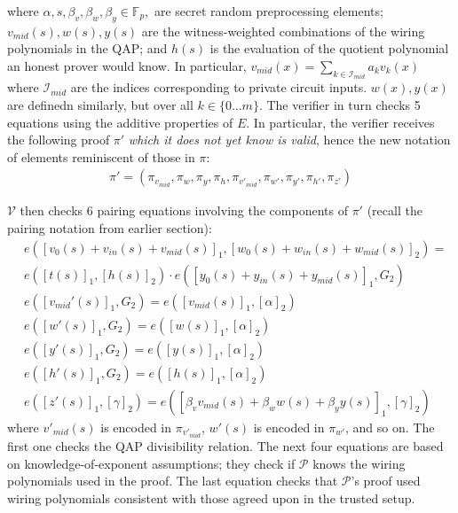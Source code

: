 where $\alpha, s, \beta_v, \beta_w, \beta_y \in \mathbb{F}_p, $ are secret random preprocessing elements; $v_{mid}(s), w(s), y(s)$ are the witness-weighted combinations of the wiring polynomials in the QAP; and $h(s)$ is the evaluation of the quotient polynomial an honest prover would know. In particular, $v_{mid}(x) = \sum_{k \in \mathcal{I}_{mid}} a_k v_k(x)$ where $\mathcal{I}_{mid}$ are the indices corresponding to private circuit inputs. $w(x), y(x)$ are definedn similarly, but over all $k \in \{0 \dots m\}$. The verifier in turn checks 5 equations using the additive properties of $E$. In particular, the verifier receives the following proof $\pi'$ \textit{which it does not yet know is valid}, hence the new notation of elements reminiscent of those in $\pi$:
\begin{align*}
\pi' = (\pi_{v_{mid}}, \pi_{w}, \pi_{y}, \pi_{h}, \pi_{v'_{mid}}, \pi_{w'}, \pi_{y'}, \pi_{h'}, \pi_{z'})
\end{align*}

\noindent $\mathcal{V}$ then checks 6 pairing equations involving the components of $\pi'$ (recall the pairing notation from earlier section):  
\begin{align}
&e([v_0(s) + v_{in}(s) + v_{mid}(s)]_1, [w_0(s) + w_{in}(s) + w_{mid}(s)]_2) = \\ 
&e([t(s)]_1, [h(s)]_2) \cdot e([y_0(s) + y_{in}(s) + y_{mid}(s)]_1, G_2) \\
&e([v_{mid}'(s)]_1, G_2) = e([v_{mid}(s)]_1, [\alpha]_2) \\
&e([w'(s)]_1, G_2) = e([w(s)]_1, [\alpha]_2) \\
&e([y'(s)]_1, G_2) = e([y(s)]_1, [\alpha]_2) \\
&e([h'(s)]_1, G_2) = e([h(s)]_1, [\alpha]_2) \\
&e([z'(s)]_1, [\gamma]_2) = e([\beta_v v_{mid}(s) + \beta_w w(s) + \beta_y y(s)]_1, [\gamma]_2)
\end{align}
\noindent where $v'_{mid}(s)$ is encoded in $\pi_{v'_{mid}}$, $w'(s)$ is encoded in $\pi_{w'}$, and so on. The first one checks the QAP divisibility relation. The next four equations are based on knowledge-of-exponent assumptions; they check if $\mathcal{P}$ knows the wiring polynomials used in the proof. The last equation checks that $\mathcal{P}$'s proof used wiring polynomials consistent with those agreed upon in the trusted setup. \\


